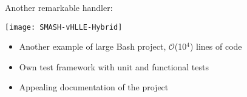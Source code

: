 \begin{frame}[fragile]{Another remarkable handler: }
    \begin{center}
        \texttt{[image: SMASH-vHLLE-Hybrid]}
    \end{center}
    \begin{itemize}
        \item Another example of large Bash project, $\mathcal{O}$(10$^\text{4}$) lines of code
        \item Own test framework with unit and functional tests
        \item Appealing documentation of the project
    \end{itemize}
\end{frame}

